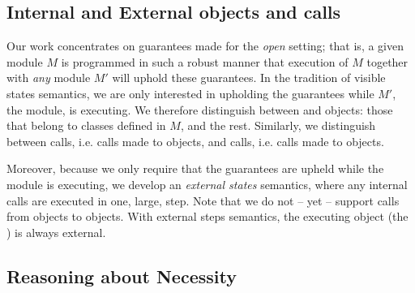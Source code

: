 


\subsection{Internal and External objects and calls}
\label{s:concepts}

Our work concentrates on guarantees made for the \emph{open} setting; that is, a given module
$M$ is programmed in such a robust manner
 that execution of $M$ together with \emph{any} \externalM 
module $M'$ will uphold these guarantees. In the tradition of
visible states semantics, we are  only interested in upholding the guarantees while 
$M'$, the  \externalM module,  is executing.   
 We therefore distinguish between \emph{\internalO} and
\emph{\externalO} objects: those that belong to classes defined in $M$, and the rest. Similarly, we 
distinguish between \emph{\internalC} calls, i.e. calls made %
 to \internalO objects, and \emph{\externalC} calls, i.e. calls made %
 to \externalC objects. %


Moreover, because we only require that the guarantees are upheld while 
  the  \externalM module  is executing, we develop an \emph{external states} semantics, where
 any internal calls are executed in one, large, step.
 Note that we do not -- yet -- support calls from
\internalO objects to \externalO objects. 
 With external steps semantics,  the executing object (the ) is always   external. 
 


\subsection{Reasoning about Necessity}
\label{s:approach}
 
